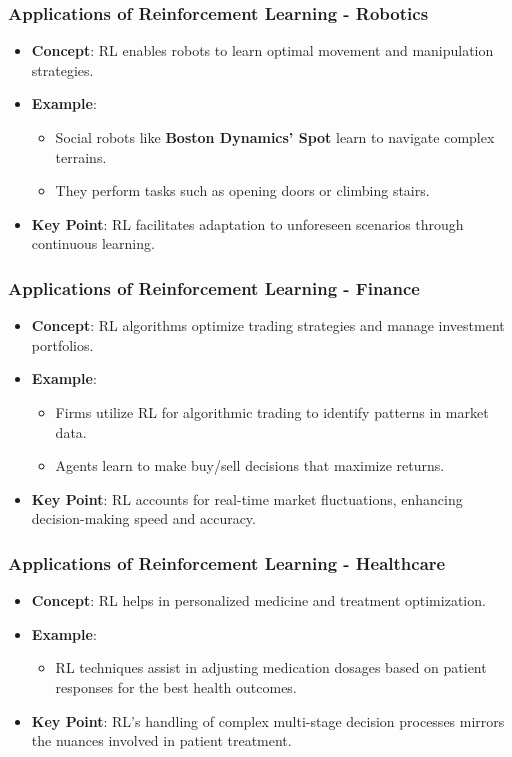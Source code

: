 \documentclass[aspectratio=169]{beamer}
\begin{document}
\begin{frame}[fragile]
    \frametitle{Applications of Reinforcement Learning - Robotics}
    \begin{itemize}
        \item \textbf{Concept}: RL enables robots to learn optimal movement and manipulation strategies.
        \item \textbf{Example}: 
            \begin{itemize}
                \item Social robots like \textbf{Boston Dynamics' Spot} learn to navigate complex terrains.
                \item They perform tasks such as opening doors or climbing stairs.
            \end{itemize}
        \item \textbf{Key Point}: RL facilitates adaptation to unforeseen scenarios through continuous learning.
    \end{itemize}
\end{frame}

\begin{frame}[fragile]
    \frametitle{Applications of Reinforcement Learning - Finance}
    \begin{itemize}
        \item \textbf{Concept}: RL algorithms optimize trading strategies and manage investment portfolios.
        \item \textbf{Example}: 
            \begin{itemize}
                \item Firms utilize RL for algorithmic trading to identify patterns in market data.
                \item Agents learn to make buy/sell decisions that maximize returns.
            \end{itemize}
        \item \textbf{Key Point}: RL accounts for real-time market fluctuations, enhancing decision-making speed and accuracy.
    \end{itemize}
\end{frame}

\begin{frame}[fragile]
    \frametitle{Applications of Reinforcement Learning - Healthcare}
    \begin{itemize}
        \item \textbf{Concept}: RL helps in personalized medicine and treatment optimization.
        \item \textbf{Example}: 
            \begin{itemize}
                \item RL techniques assist in adjusting medication dosages based on patient responses for the best health outcomes.
            \end{itemize}
        \item \textbf{Key Point}: RL's handling of complex multi-stage decision processes mirrors the nuances involved in patient treatment.
    \end{itemize}
\end{frame}
\end{document}

